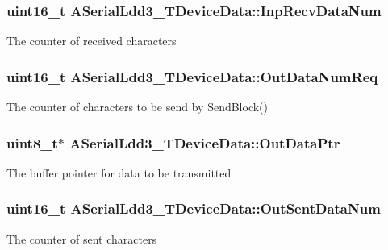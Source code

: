 \subsubsection[{\texorpdfstring{Inp\+Recv\+Data\+Num}{InpRecvDataNum}}]{\setlength{\rightskip}{0pt plus 5cm}uint16\+\_\+t A\+Serial\+Ldd3\+\_\+\+T\+Device\+Data\+::\+Inp\+Recv\+Data\+Num}\hypertarget{struct_a_serial_ldd3___t_device_data_ad76ae8501e5a6c9256bfc1fc3a963a49}{}\label{struct_a_serial_ldd3___t_device_data_ad76ae8501e5a6c9256bfc1fc3a963a49}
The counter of received characters 
\subsubsection[{\texorpdfstring{Out\+Data\+Num\+Req}{OutDataNumReq}}]{\setlength{\rightskip}{0pt plus 5cm}uint16\+\_\+t A\+Serial\+Ldd3\+\_\+\+T\+Device\+Data\+::\+Out\+Data\+Num\+Req}\hypertarget{struct_a_serial_ldd3___t_device_data_a5a0cb23a096e8d85a9454a5e3168c833}{}\label{struct_a_serial_ldd3___t_device_data_a5a0cb23a096e8d85a9454a5e3168c833}
The counter of characters to be send by Send\+Block() 
\subsubsection[{\texorpdfstring{Out\+Data\+Ptr}{OutDataPtr}}]{\setlength{\rightskip}{0pt plus 5cm}uint8\+\_\+t$\ast$ A\+Serial\+Ldd3\+\_\+\+T\+Device\+Data\+::\+Out\+Data\+Ptr}\hypertarget{struct_a_serial_ldd3___t_device_data_a1046c225ffdc7216030943b61d4e7863}{}\label{struct_a_serial_ldd3___t_device_data_a1046c225ffdc7216030943b61d4e7863}
The buffer pointer for data to be transmitted 
\subsubsection[{\texorpdfstring{Out\+Sent\+Data\+Num}{OutSentDataNum}}]{\setlength{\rightskip}{0pt plus 5cm}uint16\+\_\+t A\+Serial\+Ldd3\+\_\+\+T\+Device\+Data\+::\+Out\+Sent\+Data\+Num}\hypertarget{struct_a_serial_ldd3___t_device_data_a87d0ed131c5f8f238e5c11c3b0f3c498}{}\label{struct_a_serial_ldd3___t_device_data_a87d0ed131c5f8f238e5c11c3b0f3c498}
The counter of sent characters 
